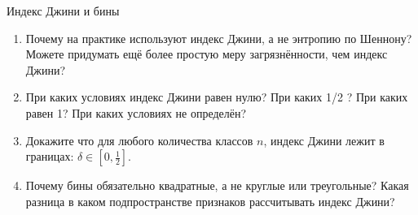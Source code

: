 \documentclass{beamer}
\begin{document}
\begin{frame}{Индекс Джини и бины}
	\begin{enumerate}
		\item Почему на практике используют индекс Джини, а не энтропию по Шеннону? 
		Можете придумать ещё более простую меру загрязнённости, чем индекс Джини?
		\item При каких условиях индекс Джини равен нулю? При каких 1/2 ? 
		При каких равен 1? При каких условиях не определён?
		\item Докажите что для любого количества классов $n$, индекс Джини лежит в границах: $\delta \in [0, \frac{1}{2}]$.
		\item Почему бины обязательно квадратные, а не круглые или треугольные? Какая разница
		в каком подпространстве признаков рассчитывать индекс Джини? 	
	\end{enumerate}
\end{frame}

  
  
\end{document}
